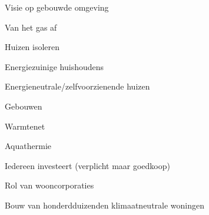 
\begin{visie-concept}{Visie op gebouwde omgeving}\end{visie-concept}

\begin{voorstel-concept}{Van het gas af}\end{voorstel-concept}
\begin{voorstel-concept}{Huizen isoleren}\end{voorstel-concept}
\begin{voorstel-concept}{Energiezuinige huishoudens}\end{voorstel-concept}
\begin{voorstel-concept}{Energieneutrale/zelfvoorzienende huizen}\end{voorstel-concept}
\begin{voorstel-concept}{Gebouwen}\end{voorstel-concept}
\begin{voorstel-concept}{Warmtenet}\end{voorstel-concept}
\begin{voorstel-concept}{Aquathermie}\end{voorstel-concept}
\begin{voorstel-concept}{Iedereen investeert (verplicht maar goedkoop)}\end{voorstel-concept}
\begin{voorstel-concept}{Rol van wooncorporaties}\end{voorstel-concept}
\begin{voorstel-concept}{Bouw van honderdduizenden klimaatneutrale woningen}\end{voorstel-concept}
 